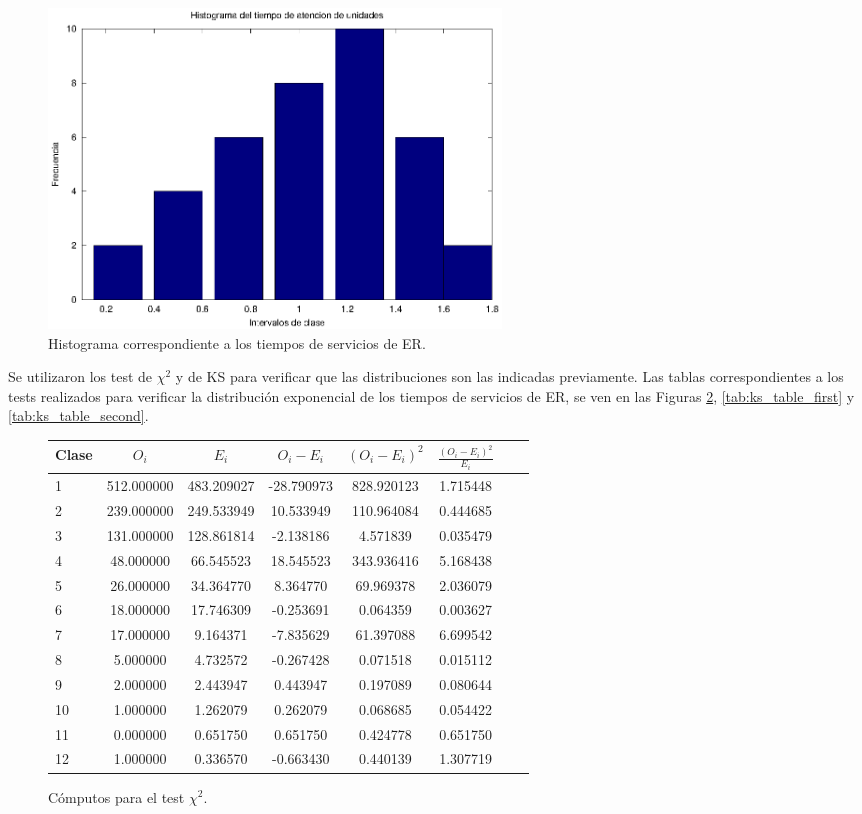 \documentclass[a4paper,10pt]{article}
\begin{document}
\begin{figure}[ht]
\begin{center}
\includegraphics[width=12cm]{../src/parteA/hist_servicios.eps}
\caption{\label{fig:hist_servicios} Histograma correspondiente a los tiempos de servicios de ER.}
\end{center}
\end{figure}

Se utilizaron los test de  $\chi^2$ y de KS para verificar que las distribuciones son las indicadas previamente. Las tablas correspondientes a los tests realizados para verificar la distribución exponencial de los tiempos de servicios de ER, se ven en las Figuras \ref{tab:chi_table}, \ref{tab:ks_table_first} y \ref{tab:ks_table_second}.

\begin{figure}[ht]
\begin{center}
\begin{tabular}{l*{6}{c}r}
\hline
Clase& $O_i$ & $E_i$  & $O_i - E_i$ & $(O_i - E_i)^2$ & $\frac{(O_i - E_i)^2}{E_i}$\\
\hline
1&512.000000&483.209027&-28.790973&828.920123&1.715448\\
2&239.000000&249.533949&10.533949&110.964084&0.444685\\
3&131.000000&128.861814&-2.138186&4.571839&0.035479\\
4&48.000000&66.545523&18.545523&343.936416&5.168438\\
5&26.000000&34.364770&8.364770&69.969378&2.036079\\
6&18.000000&17.746309&-0.253691&0.064359&0.003627\\
7&17.000000&9.164371&-7.835629&61.397088&6.699542\\
8&5.000000&4.732572&-0.267428&0.071518&0.015112\\
9&2.000000&2.443947&0.443947&0.197089&0.080644\\
10&1.000000&1.262079&0.262079&0.068685&0.054422\\
11&0.000000&0.651750&0.651750&0.424778&0.651750\\
12&1.000000&0.336570&-0.663430&0.440139&1.307719\\
\hline
\end{tabular}
\caption{\label{tab:chi_table} Cómputos para el test $\chi^2$.}
\end{center}
\end{figure}
\end{document}
